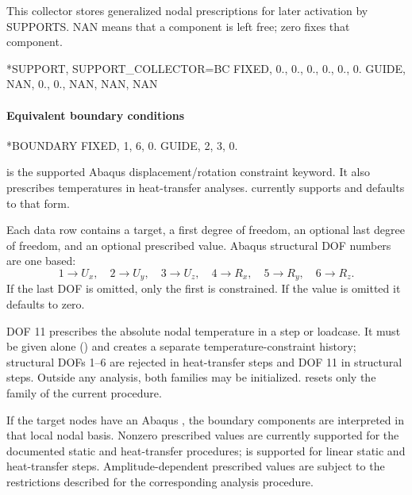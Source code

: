 This collector stores generalized nodal prescriptions for later activation by SUPPORTS. NAN means that a component is left free; zero fixes that component.

\exampleheading

\begin{inputdeck}
*SUPPORT, SUPPORT_COLLECTOR=BC
FIXED, 0., 0., 0., 0., 0., 0.
GUIDE, NAN, 0., 0., NAN, NAN, NAN
\end{inputdeck}

\paragraph*{Equivalent boundary conditions}
\begin{inputdeck}
*BOUNDARY
FIXED, 1, 6, 0.
GUIDE, 2, 3, 0.
\end{inputdeck}


 is the supported Abaqus displacement/rotation constraint keyword. It also prescribes temperatures in heat-transfer analyses.  currently supports  and defaults to that form.

Each data row contains a target, a first degree of freedom, an optional last degree of freedom, and an optional prescribed value. Abaqus structural DOF numbers are one based:
\[
1\rightarrow U_x,\quad
2\rightarrow U_y,\quad
3\rightarrow U_z,\quad
4\rightarrow R_x,\quad
5\rightarrow R_y,\quad
6\rightarrow R_z.
\]
If the last DOF is omitted, only the first is constrained. If the value is omitted it defaults to zero.

DOF 11 prescribes the absolute nodal temperature in a  step or  loadcase. It must be given alone () and creates a separate temperature-constraint history; structural DOFs 1--6 are rejected in heat-transfer steps and DOF 11 in structural steps. Outside any analysis, both families may be initialized.  resets only the family of the current procedure.

If the target nodes have an Abaqus , the boundary components are interpreted in that local nodal basis. Nonzero prescribed values are currently supported for the documented static and heat-transfer procedures;  is supported for linear static and heat-transfer steps. Amplitude-dependent prescribed values are subject to the restrictions described for the corresponding analysis procedure.

